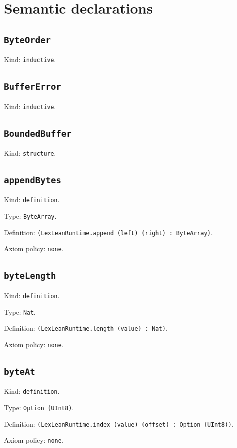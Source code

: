 \documentclass[11pt]{article}
\begin{document}
\section*{Semantic declarations}
\subsection*{\texttt{ByteOrder}}
\noindent Kind: \texttt{inductive}.\par
\subsection*{\texttt{BufferError}}
\noindent Kind: \texttt{inductive}.\par
\subsection*{\texttt{BoundedBuffer}}
\noindent Kind: \texttt{structure}.\par
\subsection*{\texttt{appendBytes}}
\noindent Kind: \texttt{definition}.\par
\noindent Type: \texttt{ByteArray}.\par
\noindent Definition: \texttt{(LexLeanRuntime.append (left) (right) : ByteArray)}.\par
\noindent Axiom policy: \texttt{none}.\par
\subsection*{\texttt{byteLength}}
\noindent Kind: \texttt{definition}.\par
\noindent Type: \texttt{Nat}.\par
\noindent Definition: \texttt{(LexLeanRuntime.length (value) : Nat)}.\par
\noindent Axiom policy: \texttt{none}.\par
\subsection*{\texttt{byteAt}}
\noindent Kind: \texttt{definition}.\par
\noindent Type: \texttt{Option (UInt8)}.\par
\noindent Definition: \texttt{(LexLeanRuntime.index (value) (offset) : Option (UInt8))}.\par
\noindent Axiom policy: \texttt{none}.\par
\end{document}

